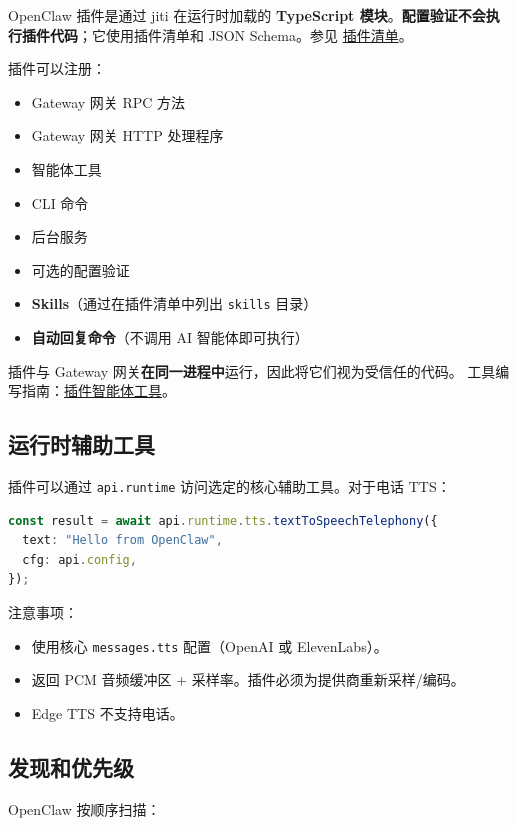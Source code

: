 OpenClaw 插件是通过 jiti 在运行时加载的 \textbf{TypeScript 模块}。\textbf{配置验证不会执行插件代码}；它使用插件清单和 JSON Schema。参见 \href{/plugins/manifest}{插件清单}。

插件可以注册：

\begin{itemize}
  \item Gateway 网关 RPC 方法
  \item Gateway 网关 HTTP 处理程序
  \item 智能体工具
  \item CLI 命令
  \item 后台服务
  \item 可选的配置验证
  \item \textbf{Skills}（通过在插件清单中列出 \texttt{skills} 目录）
  \item \textbf{自动回复命令}（不调用 AI 智能体即可执行）
\end{itemize}


插件与 Gateway 网关\textbf{在同一进程中}运行，因此将它们视为受信任的代码。
工具编写指南：\href{/plugins/agent-tools}{插件智能体工具}。

\subsection{运行时辅助工具}


插件可以通过 \texttt{api.runtime} 访问选定的核心辅助工具。对于电话 TTS：

\begin{lstlisting}[language=typescript]
const result = await api.runtime.tts.textToSpeechTelephony({
  text: "Hello from OpenClaw",
  cfg: api.config,
});
\end{lstlisting}


注意事项：

\begin{itemize}
  \item 使用核心 \texttt{messages.tts} 配置（OpenAI 或 ElevenLabs）。
  \item 返回 PCM 音频缓冲区 + 采样率。插件必须为提供商重新采样/编码。
  \item Edge TTS 不支持电话。
\end{itemize}


\subsection{发现和优先级}


OpenClaw 按顺序扫描：

